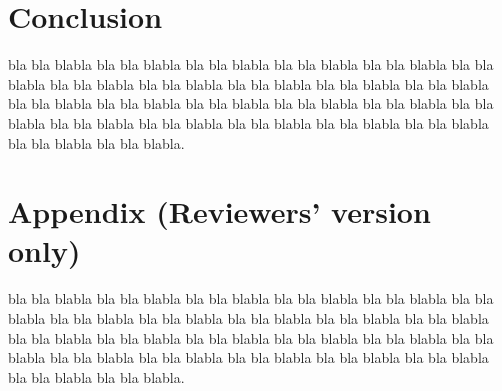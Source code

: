 \documentclass[a4paper,10pt]{llncs}
\begin{document}

\section{Conclusion}
\label{section:Conclusion}

bla bla blabla bla bla blabla bla bla blabla bla bla blabla bla bla blabla
bla bla blabla bla bla blabla bla bla blabla bla bla blabla bla bla blabla
bla bla blabla bla bla blabla bla bla blabla bla bla blabla bla bla blabla
bla bla blabla bla bla blabla bla bla blabla bla bla blabla bla bla blabla
bla bla blabla bla bla blabla bla bla blabla bla bla blabla.







\newpage
\section*{Appendix (Reviewers' version only)}

bla bla blabla bla bla blabla bla bla blabla bla bla blabla bla bla blabla
bla bla blabla bla bla blabla bla bla blabla bla bla blabla bla bla blabla
bla bla blabla bla bla blabla bla bla blabla bla bla blabla bla bla blabla
bla bla blabla bla bla blabla bla bla blabla bla bla blabla bla bla blabla
bla bla blabla bla bla blabla bla bla blabla bla bla blabla.

\end{document}
